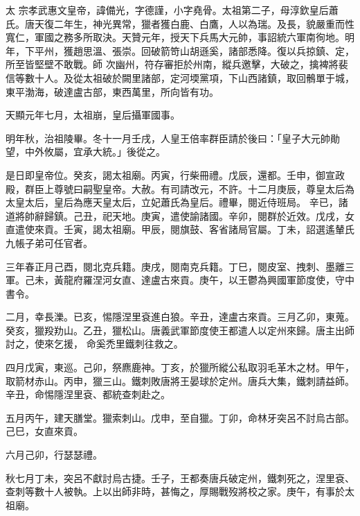 
\begin{pinyinscope}

 太
 宗孝武惠文皇帝，諱備光，字德謹，小字堯骨。太祖第二子，母淳欽皇后蕭氏。唐天復二年生，神光異常，獵者獲白鹿、白鷹，人以為瑞。及長，貌嚴重而性寬仁，軍國之務多所取決。天贊元年，授天下兵馬大元帥，事詔統六軍南徇地。明年，下平州，獲趙思溫、張崇。回破箭笴山胡遜奚，諸部悉降。復以兵掠鎮、定，所至皆堅壁不敢戰。師
 次幽州，符存審拒於州南，縱兵邀擊，大破之，擒裨將裴信等數十人。及從太祖破於闕里諸部，定河堧黨項，下山西諸鎮，取回鶻單于城，東平渤海，破達盧古部，東西萬里，所向皆有功。



 天顯元年七月，太祖崩，皇后攝軍國事。



 明年秋，治祖陵畢。冬十一月壬戌，人皇王倍率群臣請於後曰：「皇子大元帥勛望，中外攸屬，宜承大統。」後從之。



 是日即皇帝位。癸亥，謁太祖廟。丙寅，行柴冊禮。戊辰，還都。壬申，御宣政殿，群臣上尊號曰嗣聖皇帝。大赦。有司請改元，不許。十二月庚辰，尊皇太后為太皇太后，皇后為應天皇太后，立妃蕭氏為皇后。禮畢，閱近侍班局。
 辛已，諸道將帥辭歸鎮。己丑，祀天地。庚寅，遣使諭諸國。辛卯，閱群於近效。戊戌，女直遣使來貢。壬寅，謁太祖廟。甲辰，閱旗鼓、客省諸局官屬。丁未，詔選遙輦氏九帳子弟可任官者。



 三年春正月己酉，閱北克兵籍。庚戌，閱南克兵籍。丁巳，閱皮室、拽刺、墨離三軍。己未，黃龍府羅涅河女直、達盧古來貢。庚午，以王鬱為興國軍節度使，守中書令。



 二月，幸長濼。已亥，惕隱涅里袞進白狼。辛丑，達盧古來貢。三月乙卯，東蒐。癸亥，獵羖劷山。乙丑，獵松山。唐義武軍節度使王都遣人以定州來歸。唐主出師討之，使來乞援，
 命奚禿里鐵刺往救之。



 四月戊寅，東巡。己卯，祭麃鹿神。丁亥，於獵所縱公私取羽毛革木之材。甲午，取箭材赤山。丙申，獵三山。鐵刺敗唐將王晏球於定州。唐兵大集，鐵刺請益師。辛丑，命惕隱涅里袞、都統查刺赴之。



 五月丙午，建天膳堂。獵索刺山。戊申，至自獵。丁卯，命林牙突呂不討烏古部。己巳，女直來貢。



 六月己卯，行瑟瑟禮。



 秋七月丁未，突呂不獻討烏古捷。壬子，王都奏唐兵破定州，鐵刺死之，涅里袞、查刺等數十人被執。上以出師非時，甚悔之，厚賜戰歿將校之家。庚午，有事於太祖廟。




\end{pinyinscope}
